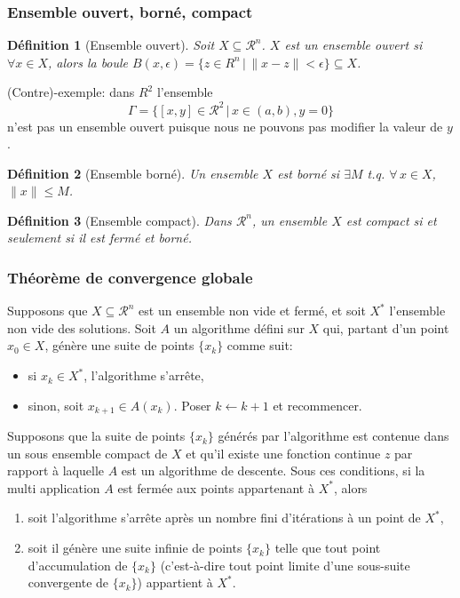 \documentclass[usepdftitle=false]{beamer}
\newtheorem{defn}{Définition}
\def\cR{\mathcal{R}}
\begin{document}
\begin{frame}
\frametitle{Ensemble ouvert, borné, compact}

\begin{defn}[Ensemble ouvert]
Soit $X \subseteq \cR^n$.
$X$ est un ensemble ouvert si $\forall x \in X$, alors la boule $B(x, \epsilon) = \{ z \in R^n \,|\, \| x - z \| < \epsilon \} \subseteq X$.
\end{defn}

(Contre)-exemple: dans $R^2$ l'ensemble
$$
\Gamma = \{ [ x, y ] \in \cR^2 \,|\, x \in ( a, b ), y = 0 \}
$$
n'est pas un ensemble ouvert puisque nous ne pouvons pas modifier la valeur de $y$.

\begin{defn}[Ensemble borné]
Un ensemble $X$ est borné si $\exists M$ t.q. $\forall\, x \in X$, $\| x \| \leq M$.
\end{defn}

\begin{defn}[Ensemble compact]
Dans $\cR^n$, un ensemble $X$ est compact si et seulement si il est fermé et borné.
\end{defn}

\end{frame}

\begin{frame}
\frametitle{Théorème de convergence globale}

Supposons que $X \subseteq \cR^n$ est un ensemble non vide et fermé, et soit $X^*$ l'ensemble non vide des solutions.
Soit $A$ un algorithme défini sur $X$ qui, partant d'un point $x_0 \in X$, génère une suite de points $\{ x_k \}$ comme suit:
\begin{itemize}
\item
si $x_k \in X^*$, l'algorithme s'arrête,
\item
sinon, soit $x_{k+1} \in A(x_k)$.
Poser $k \leftarrow k + 1$ et recommencer. %
\end{itemize}
Supposons que la suite de points $\{ x_k \}$ générés par l'algorithme est contenue dans
un sous ensemble compact de $X$ et qu'il existe une fonction continue $z$ par rapport à laquelle $A$ est un algorithme de descente.
Sous ces conditions, si la multi application $A$ est fermée aux points appartenant à $X^*$, alors
\begin{enumerate}
\item
soit l'algorithme s'arrête après un nombre fini d'itérations à un point de $X^*$,
\item
soit il génère une suite infinie de points $\{ x_k \}$ telle que tout point d'accumulation de $\{ x_k \}$ (c'est-à-dire tout point limite d'une sous-suite convergente de $\{ x_k \}$) appartient à $X^*$.
\end{enumerate}

\end{frame}
\end{document}
